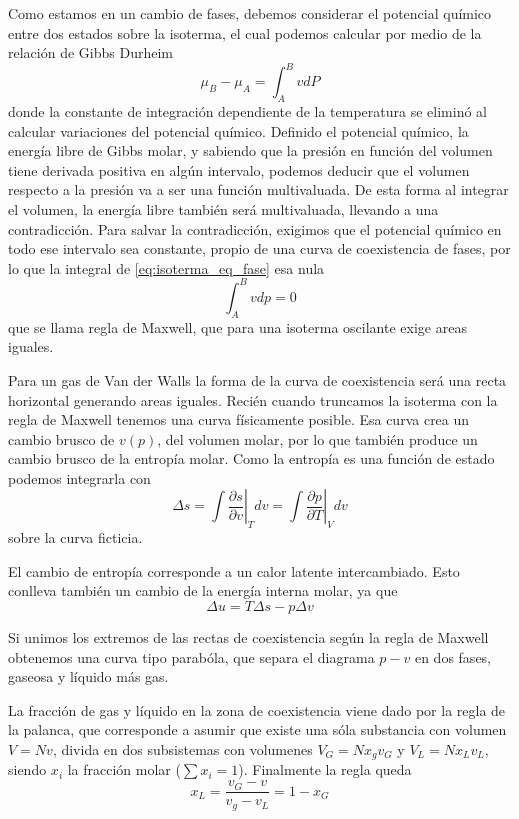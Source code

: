 \documentclass{book}
\numberwithin{equation}{section} %
\begin{document}
Como estamos en un cambio de fases, debemos considerar el potencial químico entre dos estados sobre la isoterma, el cual podemos calcular por medio de la relación de Gibbs Durheim
\begin{equation}
    \mu_B - \mu_A = \int^B_A v dP
    \label{eq:isoterma_eq_fase}
\end{equation}
donde la constante de integración dependiente de la temperatura se eliminó al calcular variaciones del potencial químico.
Definido el potencial químico, la energía libre de Gibbs molar, y sabiendo que la presión en función del volumen tiene derivada positiva en algún intervalo, podemos deducir que el volumen respecto a la presión va a ser una función multivaluada.
De esta forma al integrar el volumen, la energía libre también será multivaluada, llevando a una contradicción.
Para salvar la contradicción, exigimos que el potencial químico en todo ese intervalo sea constante, propio de una curva de coexistencia de fases, por lo que la integral de \ref{eq:isoterma_eq_fase} esa nula
\begin{equation}
    \int^B_A v dp = 0
    \label{eq:regla_maxwell}
\end{equation}
que se llama regla de Maxwell, que para una isoterma oscilante exige areas iguales.

Para un gas de Van der Walls la forma de la curva de coexistencia será una recta horizontal generando areas iguales.
Recién cuando truncamos la isoterma con la regla de Maxwell tenemos una curva físicamente posible.
Esa curva crea un cambio brusco de $v(p)$, del volumen molar, por lo que también produce un cambio brusco de la entropía molar.
Como la entropía es una función de estado podemos integrarla con
\[ \Delta s = \int \left.\frac{\partial s}{\partial v}\right|_T dv = \int \left.\frac{\partial p}{\partial T}\right|_V dv\]
sobre la curva ficticia.

El cambio de entropía corresponde a un calor latente intercambiado.
Esto conlleva también un cambio de la energía interna molar, ya que
\[ \Delta u = T \Delta s - p \Delta v\]

Si unimos los extremos de las rectas de coexistencia según la regla de Maxwell obtenemos una curva tipo parabóla, que separa el diagrama $p-v$ en dos fases, gaseosa y líquido más gas.

La fracción de gas y líquido en la zona de coexistencia viene dado por la regla de la palanca, que corresponde a asumir que existe una sóla substancia con volumen $V = N v$, divida en dos subsistemas con volumenes $V_G = N x_g v_G$ y $V_L = N x_L v_L$, siendo $x_i$ la fracción molar ($\sum x_i = 1$).
Finalmente la regla queda
\begin{equation}
x_L = \frac{v_G - v}{v_g - v_L} = 1 - x_G
\end{equation}
\end{document}
